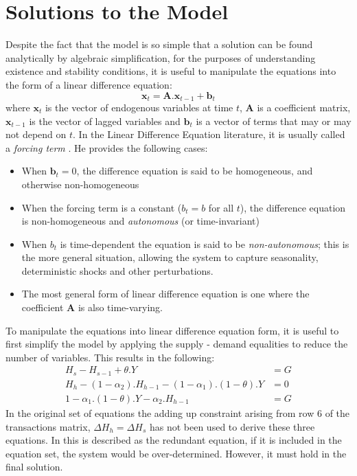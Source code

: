 \documentclass[twoside,a4paper,11pt]{article}
\begin{document}
\section{Solutions to the Model}
Despite the fact that the model is so simple that a solution can be found analytically by algebraic simplification, for the purposes of understanding existence and stability conditions, it is useful to manipulate the equations into the form of a linear difference equation:
\newcommand{\vect}[1]{\mathbf{#1}}
$$\vect{x}_t = \vect{A}.\vect{x}_{t-1} + \vect{b}_t$$
where $\vect{x}_t$ is the vector of endogenous variables at time $t$, $\vect{A}$ is a coefficient matrix,
$\vect{x}_{t-1}$ is the vector of lagged variables and $\vect{b}_t$ is a vector of terms that may or may not depend on $t$. In the Linear Difference Equation literature, it is usually called a \emph{forcing term} \cite[pg.~2]{tirelli:2014}. He provides the following cases:
\begin{itemize}
\item When $\vect{b}_t = 0$, the difference equation is said to be homogeneous, and otherwise non-homogeneous
\item When the forcing term is a constant ($b_t = b$ for all $t$), the difference equation is non-homogeneous and \emph{autonomous} (or time-invariant)
\item When $b_t$ is time-dependent the equation is said to be \emph{non-autonomous}; this is the more general situation, allowing the system to capture seasonality, deterministic shocks and other perturbations.
\item The most general form of linear difference equation is one where the coefficient  $\vect{A}$ is also time-varying.
\end{itemize}
To manipulate the equations into linear difference equation form, it is useful to first simplify the model by applying the supply - demand equalities to reduce the number of variables. This results in the following:
\begin{align}
H_s - H_{s-1} + \theta.Y & = G\\
H_h - (1-\alpha_2).H_{h-1} - (1-\alpha_1).(1-\theta).Y & = 0\\
1-\alpha_1.(1-\theta).Y - \alpha_2.H_{h-1} & = G
\end{align}
In the original set of equations the adding up constraint arising from row 6 of the transactions matrix,
$\Delta H_h = \Delta H_s$ has not been used to derive these three equations. 
In \cite[pg.~68]{godleylavoie:2007}  this is described as the redundant equation, if it is included in the equation set, the system would be over-determined. However, it must hold in the final solution.
\end{document}
